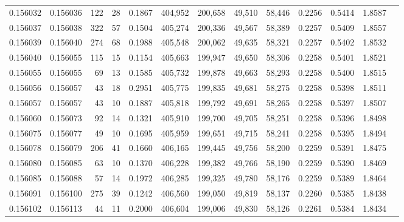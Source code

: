 \begin{tabular}{rrrrrrrrrrrrr}
0.156032 & 0.156036 &   122 &  28 &                                     0.1867 & 404,952 & 200,658 &  49,510 &  58,446 & 0.2256 & 0.5414 & 1.8587 \\
0.156037 & 0.156038 &   322 &  57 &                                     0.1504 & 405,274 & 200,336 &  49,567 &  58,389 & 0.2257 & 0.5409 & 1.8557 \\
0.156039 & 0.156040 &   274 &  68 &                                     0.1988 & 405,548 & 200,062 &  49,635 &  58,321 & 0.2257 & 0.5402 & 1.8532 \\
0.156040 & 0.156055 &   115 &  15 &                                     0.1154 & 405,663 & 199,947 &  49,650 &  58,306 & 0.2258 & 0.5401 & 1.8521 \\
0.156055 & 0.156055 &    69 &  13 &                                     0.1585 & 405,732 & 199,878 &  49,663 &  58,293 & 0.2258 & 0.5400 & 1.8515 \\
0.156056 & 0.156057 &    43 &  18 &                                     0.2951 & 405,775 & 199,835 &  49,681 &  58,275 & 0.2258 & 0.5398 & 1.8511 \\
0.156057 & 0.156057 &    43 &  10 &                                     0.1887 & 405,818 & 199,792 &  49,691 &  58,265 & 0.2258 & 0.5397 & 1.8507 \\
0.156060 & 0.156073 &    92 &  14 &                                     0.1321 & 405,910 & 199,700 &  49,705 &  58,251 & 0.2258 & 0.5396 & 1.8498 \\
0.156075 & 0.156077 &    49 &  10 &                                     0.1695 & 405,959 & 199,651 &  49,715 &  58,241 & 0.2258 & 0.5395 & 1.8494 \\
0.156078 & 0.156079 &   206 &  41 &                                     0.1660 & 406,165 & 199,445 &  49,756 &  58,200 & 0.2259 & 0.5391 & 1.8475 \\
0.156080 & 0.156085 &    63 &  10 &                                     0.1370 & 406,228 & 199,382 &  49,766 &  58,190 & 0.2259 & 0.5390 & 1.8469 \\
0.156085 & 0.156088 &    57 &  14 &                                     0.1972 & 406,285 & 199,325 &  49,780 &  58,176 & 0.2259 & 0.5389 & 1.8464 \\
0.156091 & 0.156100 &   275 &  39 &                                     0.1242 & 406,560 & 199,050 &  49,819 &  58,137 & 0.2260 & 0.5385 & 1.8438 \\
0.156102 & 0.156113 &    44 &  11 &                                     0.2000 & 406,604 & 199,006 &  49,830 &  58,126 & 0.2261 & 0.5384 & 1.8434 \\

\end{tabular}
